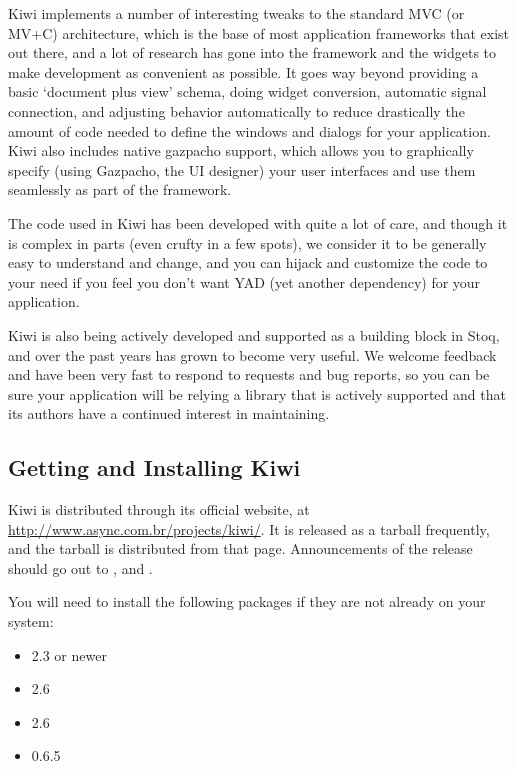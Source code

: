 \documentclass[a4paper]{howto}
\begin{document}
Kiwi implements a number of interesting tweaks to the standard MVC (or
MV+C) architecture, which is the base of most application frameworks
that exist out there, and a lot of research has gone into the framework
and the widgets to make development as convenient as possible. It goes
way beyond providing a basic `document plus view' schema, doing widget
conversion, automatic signal connection, and adjusting behavior
automatically to reduce drastically the amount of code needed to define
the windows and dialogs for your application. Kiwi also includes native
gazpacho support, which allows you to graphically specify (using
Gazpacho, the UI designer) your user interfaces and use them seamlessly
as part of the framework.

The code used in Kiwi has been developed with quite a lot of care, and
though it is complex in parts (even crufty in a few spots), we consider
it to be generally easy to understand and change, and you can hijack and
customize the code to your need if you feel you don't want YAD (yet
another dependency) for your application.

Kiwi is also being actively developed and supported as a building block
in Stoq, and over the past years has grown to become very useful.
We welcome feedback and have been very fast to respond to requests and
bug reports, so you can be sure your application will be relying a
library that is actively supported and that its authors have a
continued interest in maintaining.

\subsection{Getting and Installing Kiwi}

Kiwi is distributed through its official website, at
\url{http://www.async.com.br/projects/kiwi/}. It is released as a
tarball frequently, and the tarball is distributed from that page.
Announcements of the release should go out to ,
 and .

You will need to install the following packages if they are not
already on your system:

\begin{itemize}
  \item  {} 2.3 or newer
  \item  {} 2.6
  \item  {} 2.6
  \item  {} 0.6.5
\end{itemize}
\end{document}
